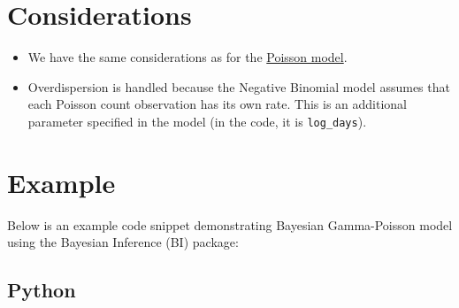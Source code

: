 \documentclass[
  letterpaper,
  DIV=11,
  numbers=noendperiod]{scrreprt}
\begin{document}
\section{Considerations}\label{considerations-7}

\begin{tcolorbox}[enhanced jigsaw, toptitle=1mm, opacityback=0, titlerule=0mm, breakable, bottomrule=.15mm, colframe=quarto-callout-caution-color-frame, arc=.35mm, coltitle=black, left=2mm, opacitybacktitle=0.6, leftrule=.75mm, toprule=.15mm, rightrule=.15mm, bottomtitle=1mm, colbacktitle=quarto-callout-caution-color!10!white, title=\textcolor{quarto-callout-caution-color}{\faFire}\hspace{0.5em}{Caution}, colback=white]

\begin{itemize}
\item
  We have the same considerations as for the
  \href{7.\%20Poisson\%20model.qmd}{Poisson model}.
\item
  Overdispersion is handled because the Negative Binomial model assumes
  that each Poisson count observation has its own rate. This is an
  additional parameter specified in the model (in the code, it is
  \texttt{log\_days}).
\end{itemize}

\end{tcolorbox}

\section{Example}\label{example-7}

Below is an example code snippet demonstrating Bayesian Gamma-Poisson
model using the Bayesian Inference (BI) package:

\subsection{Python}
\end{document}
